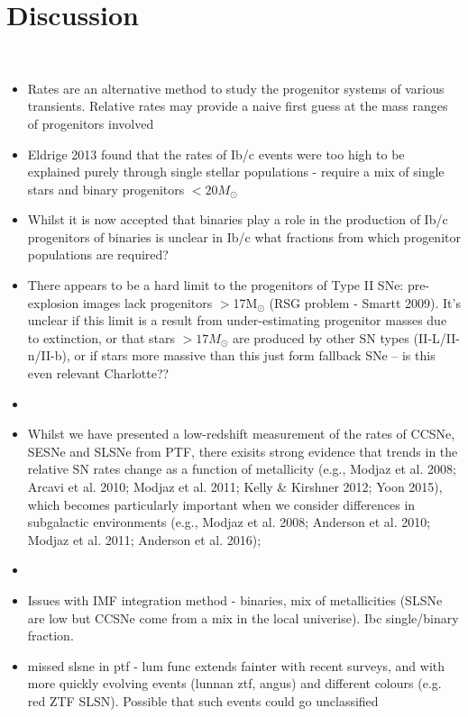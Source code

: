 \documentclass[a4paper,fleqn,usenatbib]{mnras}
\newcommand{\angus}[1]{\color{JungleGreen}#1\color{black}}
\begin{document}
\section{Discussion}

{\angus{{\bf Angus to organise into something coherant and flesh out with appropriate bullshit} \\

{\begin{itemize}
    \item Rates are an alternative method to study the progenitor systems of various transients. Relative rates may provide a naive first guess at the mass ranges of progenitors involved
    
    \item Eldrige 2013 found that the rates of Ib/c events were too high to be explained purely through single stellar populations - require a mix of single  stars and binary progenitors $<20M_{\odot}$
    
    \item Whilst it is now accepted that binaries play a role in the production of Ib/c progenitors of binaries is unclear in Ib/c what fractions from which progenitor populations are required? 
    
    \item There appears to be a hard limit to the progenitors of Type II SNe: pre-explosion images lack progenitors $>$17M$_{\odot}$ (RSG problem - Smartt 2009). It's unclear if this limit is a result from under-estimating progenitor masses due to extinction, or that stars $>17M_{\odot}$ are produced by other SN types (II-L/II-n/II-b), or if stars more massive than this just form fallback SNe -- is this even relevant Charlotte??
    
    \item 
    
    \item Whilst we have presented a low-redshift measurement of the rates of CCSNe, SESNe and SLSNe from PTF, there exisits strong evidence that trends in the relative SN rates change as a function of metallicity (e.g., Modjaz et al. 2008; Arcavi et al. 2010; Modjaz et al. 2011; Kelly \& Kirshner 2012; Yoon 2015), which becomes particularly important when we consider differences in subgalactic environments (e.g., Modjaz et al. 2008; Anderson et al. 2010; Modjaz et al. 2011; Anderson et al. 2016); 
    
    \item 
    \item Issues with IMF integration method - binaries, mix of metallicities (SLSNe are low but CCSNe come from a mix in the local univerise). Ibc single/binary fraction. 
    \item missed slsne in ptf - lum func extends fainter with recent surveys, and with more quickly evolving events (lunnan ztf, angus) and different colours (e.g. red ZTF SLSN). Possible that such events could go unclassified
\end{itemize}}

}}
\end{document}
